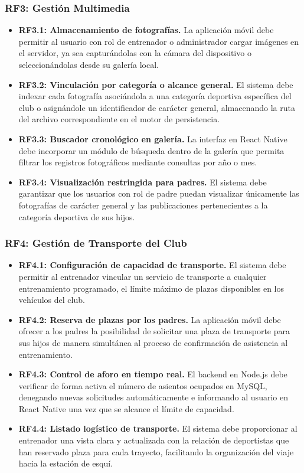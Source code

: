         \subsubsection*{RF3: Gestión Multimedia}
        \begin{itemize}
            \item \textbf{RF3.1: Almacenamiento de fotografías.} La aplicación móvil debe permitir al usuario con rol de entrenador o administrador cargar imágenes en el servidor, ya sea capturándolas con la cámara del dispositivo o seleccionándolas desde su galería local.
            \item \textbf{RF3.2: Vinculación por categoría o alcance general.} El sistema debe indexar cada fotografía asociándola a una categoría deportiva específica del club o asignándole un identificador de carácter general, almacenando la ruta del archivo correspondiente en el motor de persistencia.
            \item \textbf{RF3.3: Buscador cronológico en galería.} La interfaz en React Native debe incorporar un módulo de búsqueda dentro de la galería que permita filtrar los registros fotográficos mediante consultas por año o mes.
            \item \textbf{RF3.4: Visualización restringida para padres.} El sistema debe garantizar que los usuarios con rol de padre puedan visualizar únicamente las fotografías de carácter general y las publicaciones pertenecientes a la categoría deportiva de sus hijos.
        \end{itemize}

        \subsubsection*{RF4: Gestión de Transporte del Club}
        \begin{itemize}
            \item \textbf{RF4.1: Configuración de capacidad de transporte.} El sistema debe permitir al entrenador vincular un servicio de transporte a cualquier entrenamiento programado, el límite máximo de plazas disponibles en los vehículos del club.
            \item \textbf{RF4.2: Reserva de plazas por los padres.} La aplicación móvil debe ofrecer a los padres la posibilidad de solicitar una plaza de transporte para sus hijos de manera simultánea al proceso de confirmación de asistencia al entrenamiento.
            \item \textbf{RF4.3: Control de aforo en tiempo real.} El backend en Node.js debe verificar de forma activa el número de asientos ocupados en MySQL, denegando nuevas solicitudes automáticamente e informando al usuario en React Native una vez que se alcance el límite de capacidad.
            \item \textbf{RF4.4: Listado logístico de transporte.} El sistema debe proporcionar al entrenador una vista clara y actualizada con la relación de deportistas que han reservado plaza para cada trayecto, facilitando la organización del viaje hacia la estación de esquí.
        \end{itemize}

